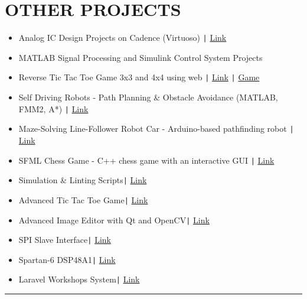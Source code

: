 \documentclass[11pt,a4paper]{article}
\begin{document}
\section*{\fontsize{14}{18}\textbf\selectfont OTHER PROJECTS}
\vspace{-0.3cm}
\begin{itemize}[noitemsep, left=0pt, itemsep=5pt]
\item Analog IC Design Projects on Cadence (Virtuoso) \texttt{|} \href{https://github.com/salah0eldin/Analog_Projects}{Link}
\item MATLAB Signal Processing and Simulink Control System Projects
\item Reverse Tic Tac Toe Game 3x3 and 4x4 using web \texttt{|} \href{https://github.com/salah0eldin/Tic_tac_toe_AVOID_THE_X}{Link} \texttt{|} \href{https://salah0eldin.github.io/Tic_tac_toe_AVOID_THE_X/}{Game}
\item Self Driving Robots - Path Planning \& Obstacle Avoidance (MATLAB, FMM2, A*) \texttt{|} \href{https://github.com/salah0eldin/PathPLanningUsingFMM2andAStar}{Link}
\item Maze-Solving Line-Follower Robot Car - Arduino-based pathfinding robot \texttt{|} \href{https://github.com/salah0eldin/ArduinoCarLineFollowerMazeSolver-Saver}{Link}
\item SFML Chess Game - C++ chess game with an interactive GUI \texttt{|} \href{https://github.com/salah0eldin/CHESS_CPP_SFML}{Link}
\item Simulation \& Linting Scripts\texttt{|} {\href{https://github.com/salah0eldin/Scripts}{Link}}
\item Advanced Tic Tac Toe Game\texttt{|} {\href{https://www.linkedin.com/posts/salah-eldin-hassen-5bba10250_qt-cplusplus-softwaredevelopment-activity-7227345922031009793-xhzd/?rcm=ACoAAD4WDF8Bk9P5oS-irdrlv53Rzjd03ps4OSA}{Link}}
\item Advanced Image Editor with Qt and OpenCV\texttt{|} {\href{https://github.com/salah0eldin/CODSOFT/tree/main/C%2B%2B/Task5%20-%20ImageProcessing/ImageEdit}{Link}}
\item SPI Slave Interface\texttt{|} {\href{https://github.com/salah0eldin/Digital-Projects/tree/master/SPI_Slave_Interface}{Link}}
\item Spartan-6 DSP48A1\texttt{|} {\href{https://github.com/salah0eldin/Digital-Projects/tree/master/DSP48A1}{Link}}
\item Laravel Workshops System\texttt{|} {\href{https://github.com/salah0eldin/WorkshopsSystem}{Link}}
\end{itemize}
\vspace{-0.6cm}
\rule{\textwidth}{0.3pt}\\
\vspace{-0.5cm}
\centering
\end{document}
